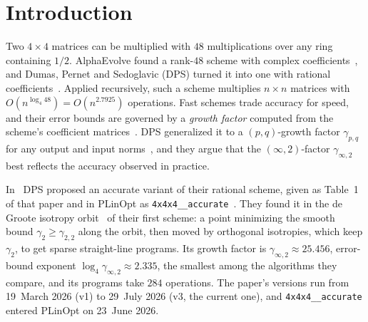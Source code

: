 \documentclass[11pt]{article}
\theoremstyle{remark}
\newcommand{\ginf}{\gamma_{\infty,2}}
\newcommand{\acc}{\texttt{4x4x4\_\allowbreak 48\_\allowbreak accurate}\xspace}
\begin{document}
\section{Introduction}\label{sec:intro}

Two $4\times4$ matrices can be multiplied with $48$ multiplications over
any ring containing $1/2$.  AlphaEvolve found a rank-$48$ scheme with
complex coefficients~\cite{Novikov25}, and Dumas, Pernet and Sedoglavic
(DPS) turned it into one with rational coefficients~\cite{DPS25}.
Applied recursively, such a scheme multiplies $n\times n$ matrices with
$O(n^{\log_4 48})=O(n^{2.7925})$ operations.  Fast schemes trade
accuracy for speed, and their error bounds are governed by a
\emph{growth factor} computed from the scheme's coefficient
matrices~\cite{Brent70,BL80,DDHK07,Higham02}.  DPS generalized it to a
$(p,q)$-growth factor $\gamma_{p,q}$ for any output and input
norms~\cite{DPS24,DPS26b}, and they argue that the
$(\infty,2)$-factor $\ginf$ best reflects the accuracy observed in
practice.

In~\cite{DPS26a} DPS proposed an accurate variant of their rational
scheme, given as Table~1 of that paper and in PLinOpt as
\acc~\cite{PLinOpt}.  They found it in the de
Groote isotropy orbit~\cite{deGroote78} of their first scheme: a point
minimizing the smooth bound $\gamma_2\ge\gamma_{2,2}$ along the orbit,
then moved by orthogonal isotropies, which keep $\gamma_2$, to get
sparse straight-line programs.  Its growth factor is $\ginf\approx25.456$,
error-bound exponent $\log_4\ginf\approx2.335$, the smallest among the
algorithms they compare, and its programs take $284$ operations.  The
paper's versions run from 19~March 2026 (v1) to 29~July 2026 (v3, the
current one), and \acc entered PLinOpt on 23~June 2026.
\end{document}
